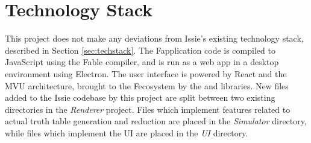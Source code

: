 \section{Technology Stack}
This project does not make any deviations from Issie's existing technology stack, described in Section \ref{sec:techstack}. The F\fsharp application code is compiled to JavaScript using the Fable compiler, and is run as a web app in a desktop environment using Electron. The user interface is powered by React and the MVU architecture, brought to the F\fsharp ecosystem by the  and  libraries. New files added to the Issie codebase by this project are split between two existing directories in the \textit{Renderer} project. Files which implement features related to actual truth table generation and reduction are placed in the \textit{Simulator} directory, while files which implement the UI are placed in the \textit{UI} directory. 







